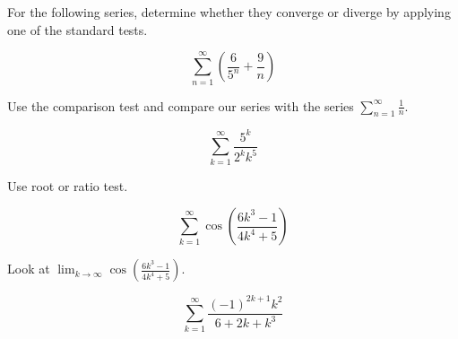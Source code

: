 \documentclass{ximera}
\author{Jason Miller}
\begin{document}
\begin{exercise}
For the following series, determine whether they converge or diverge by applying one of the standard tests. 


\begin{exercise}

\[
\sum^{\infty}_{n=1}
\left( \frac{6}{5^n} + \frac{9}{n} \right)
\]

\begin{multipleChoice}
\end{multipleChoice}

\begin{feedback}[correct]
Use the comparison test and compare our series with the series $\sum^{\infty}_{n=1} \frac{1}{n}$. 
\end{feedback}
\end{exercise}


\begin{exercise}

\[
\sum^{\infty}_{k=1} \frac{5^k}{2^k k^5}
\]



\begin{multipleChoice}
\end{multipleChoice}

\begin{feedback}[correct]
Use root or ratio test. 
\end{feedback}
\end{exercise}


\begin{exercise}


\[
\sum^{\infty}_{k=1}  \cos\left( \frac{ 6k^3-1}{4k^4 + 5} \right)
\]



\begin{multipleChoice}
\end{multipleChoice}

\begin{feedback}[correct]
Look at $\lim_{k \to \infty}  \cos\left( \frac{ 6k^3-1}{4k^4 + 5}\right)$. 
\end{feedback}
\end{exercise}




\begin{exercise}

\[
\sum^{\infty}_{k=1} \frac{(-1)^{2k+1} k^2}{6+2k+k^3}
\]


\end{exercise}
\end{exercise}
\end{document}
